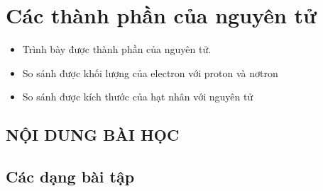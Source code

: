\section{Các thành phần của nguyên tử}
\begin{Muctieu}
	\begin{itemize}
		\item Trình bày được thành phần của nguyên tử.
		\item So sánh được khối lượng của electron với proton và nơtron
		\item So sánh được kích thước của hạt nhân với nguyên tử
	\end{itemize}
\end{Muctieu}
\subsection{NỘI DUNG BÀI HỌC}
	
\newpage
\subsection{Các dạng bài tập}
	
